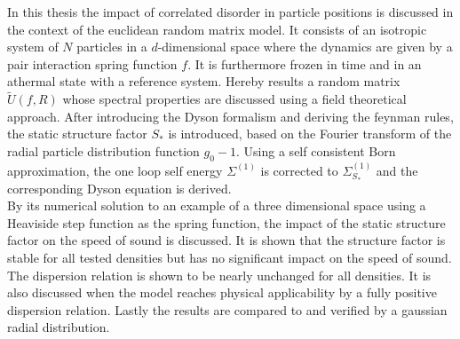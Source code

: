 In this thesis the impact of correlated disorder in particle positions is discussed in the context of the euclidean random matrix model. It consists of an isotropic system of $N$ particles in a $d$-dimensional space where the dynamics are given by a pair interaction spring function $f$. It is furthermore frozen in time and in an athermal state with a reference system. Hereby results a random matrix $\tilde U(f,R)$ whose spectral properties are discussed using a field theoretical approach. After introducing the Dyson formalism and deriving the feynman rules, the static structure factor $S_*$ is introduced, based on the Fourier transform of the radial particle distribution function $g_0 - 1$. Using a self consistent Born approximation, the one loop self energy $\Sigma^{(1)}$ is corrected to $\Sigma_{S_*}^{(1)}$ and the corresponding Dyson equation is derived. \\

By its numerical solution to an example of a three dimensional space using a Heaviside step function as the spring function, the impact of the static structure factor on the speed of sound is discussed. It is shown that the structure factor is stable for all tested densities but has no significant impact on the speed of sound. The dispersion relation is shown to be nearly unchanged for all densities. It is also discussed when the model reaches physical applicability by a fully positive dispersion relation. Lastly the results are compared to and verified by a gaussian radial distribution.  
